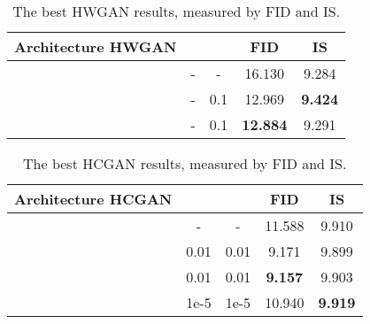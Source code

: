\documentclass[journal]{IEEEtran}
\begin{document}
\begin{table}[H]
  \centering
  \begin{tabular}{|c|c|c|c|c|}
  \hline
  Architecture HWGAN&  && FID  & IS  \\
  \hline
  &-&-& 16.130 & 9.284\\
  \hline
  &-&0.1& 12.969&\textbf{9.424}\\
  \hline
  &-&0.1&\textbf{12.884} & 9.291\\
  \hline
  \end{tabular}
  \caption{The best HWGAN results, measured by FID and IS.}
  \label{table_hwgan}
\end{table}


\begin{table}[H]
  \centering
  \begin{tabular}{|c|c|c|c|c|}
  \hline
  Architecture HCGAN&  && FID  & IS  \\
  \hline
  &-&-& 11.588 & 9.910\\
  \hline
  &0.01&0.01& 9.171 & 9.899\\
  \hline
  &0.01&0.01& \textbf{9.157} & 9.903\\
  \hline
    &1e-5&1e-5& 10.940 & \textbf{9.919}\\
  \hline
  \end{tabular}
  \caption{The best HCGAN results, measured by FID and IS.}
  \label{table_hcgan}
\end{table}
\end{document}
